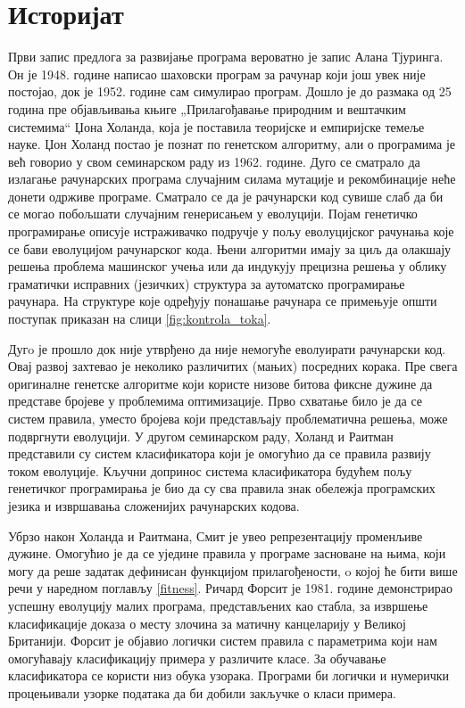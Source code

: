 \documentclass[a4paper]{article}
\begin{document}
\section{Историјат}
Први запис предлога за развијање програма вероватно је запис Алана Тјуринга. Он је 1948. године написао шаховски програм за рачунар који још увек није постојао, док је 1952. године сам симулирао програм. Дошло је до размака од 25 година пре објављивања књиге „Прилагођавање природним и вештачким системима“ Џона Холанда, која је поставила теоријске и емпиријске темеље науке.
Џон Холанд постао је познат по генетском алгоритму, али о програмима је већ говорио у свом семинарском раду из 1962. године. Дуго се сматрало да излагање рачунарских програма
случајним силама мутације и рекомбинације неће донети одрживе програме. Сматрало се да је рачунарски код сувише слаб да би се могао побољшати случајним генерисањем у еволуцији.
Појам генетичко програмирање описује истраживачко подручје у пољу еволуцијског рачунања које се бави еволуцијом рачунарског кода. Њени алгоритми имају за циљ да олакшају решења проблема машинског учења или да индукују прецизна решења у облику граматички исправних (језичких) структура за аутоматско програмирање рачунара. На структуре које одређују понашање рачунара се примењује општи поступак приказан на слици \ref{fig:kontrola_toka}.


Дугo је прошло док није утврђено  да није немогуће еволуирати рачунарски код. Овај развој захтевао је неколико различитих (мањих) посредних корака. Пре свега оригиналне генетске алгоритме који користе низове битова фиксне дужине да представе бројеве у проблемима оптимизације. Прво схватање било је да се систем правила, уместо бројева који представљају проблематична решења, може подвргнути еволуцији. У другом семинарском раду, Холанд и Раитман представили су систем класификатора који је омогућио да се правила развију током еволуције. Кључни допринос система класификатора будућем пољу генетичког програмирања је био да су сва правила знак обележја програмских језика и извршавања сложенијих рачунарских кодова.


Убрзо након Холанда и Раитмана, Смит је увео репрезентацију променљиве дужине.  Омогућио је да се уједине правила у програме засноване на њима, који могу да реше задатак дефинисан функцијом прилагођености, o којој ће бити више речи у наредном поглављу \ref{fitness}. Ричард Форсит је 1981. године демонстрирао успешну еволуцију малих програма, представљених као стабла, за извршење класификације доказа о месту злочина за матичну канцеларију у Великој Британији. Форсит је објавио логички систем правила с параметрима који нам омогућавају класификацију примера у различите класе. За обучавање класификатора се користи низ обука узорака. Програми би логички и нумерички процењивали узорке података да би добили закључке о класи примера.
\end{document}
